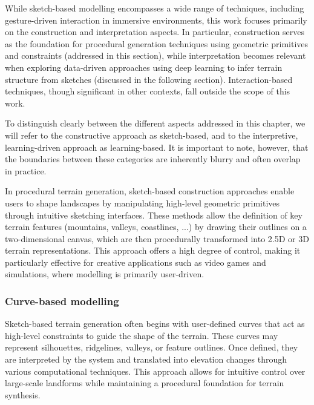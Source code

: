 While sketch-based modelling encompasses a wide range of techniques, including gesture-driven interaction in immersive environments, this work focuses primarily on the construction and interpretation aspects. In particular, construction serves as the foundation for procedural generation techniques using geometric primitives and constraints (addressed in this section), while interpretation becomes relevant when exploring data-driven approaches using deep learning to infer terrain structure from sketches (discussed in the following section). Interaction-based techniques, though significant in other contexts, fall outside the scope of this work.

To distinguish clearly between the different aspects addressed in this chapter, we will refer to the constructive approach as sketch-based, and to the interpretive, learning-driven approach as learning-based. It is important to note, however, that the boundaries between these categories are inherently blurry and often overlap in practice.

In procedural terrain generation, sketch-based construction approaches enable users to shape landscapes by manipulating high-level geometric primitives through intuitive sketching interfaces. These methods allow the definition of key terrain features (mountains, valleys, coastlines, ...) by drawing their outlines on a two-dimensional canvas, which are then procedurally transformed into 2.5D or 3D terrain representations. This approach offers a high degree of control, making it particularly effective for creative applications such as video games and simulations, where modelling is primarily user-driven.

\subsubsection{Curve-based modelling}

Sketch-based terrain generation often begins with user-defined curves that act as high-level constraints to guide the shape of the terrain. These curves may represent silhouettes, ridgelines, valleys, or feature outlines. Once defined, they are interpreted by the system and translated into elevation changes through various computational techniques. This approach allows for intuitive control over large-scale landforms while maintaining a procedural foundation for terrain synthesis.

